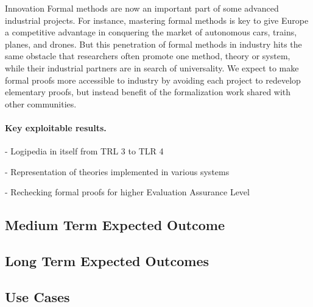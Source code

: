 Innovation Formal methods are now an important part of some advanced
industrial projects. For instance, mastering formal methods is key to
give Europe a competitive advantage in conquering the market of
autonomous cars, trains, planes, and drones. But this penetration of
formal methods in industry hits the same obstacle that researchers
often promote one method, theory or system, while their industrial
partners are in search of universality. We expect to make formal
proofs more accessible to industry by avoiding each project to
redevelop elementary proofs, but instead benefit of the formalization
work shared with other communities.


\paragraph{Key exploitable results.}

- Logipedia in itself from TRL 3 to TLR 4

- Representation of theories implemented in various systems

- Rechecking formal proofs for higher Evaluation Assurance Level


\subsection{Medium Term Expected Outcome}

\subsection{Long Term Expected Outcomes}
\subsection{Use Cases}
